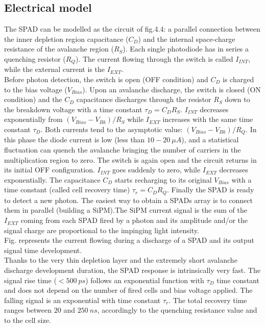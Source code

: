 \subsection*{Electrical model}
The SPAD can be modelled as the circuit of fig.4.4:  a parallel connection between the inner depletion region capacitance ($C_D$) and the internal space-charge resistance of the avalanche region ($R_S$). Each single photodiode has in series a quenching resistor ($R_Q$). The current flowing through the switch is called $I_{INT}$, while the external current is the $I_{EXT}$.\\
Before photon detection, the switch is open (OFF condition) and $C_D$ is charged to the bias voltage ($V_{Bias}$). Upon an avalanche discharge, the switch is closed (ON condition) and the $C_D$ capacitance discharges through the resistor $R_S$ down to the breakdown voltage with a time constant $\tau_D=C_D R_S$. $I_{INT}$ decreases exponentially from $(V_{Bias}-V_{Bk})/R_S$ while $I_{EXT}$ increases with the same time constant $\tau_D$. Both currents tend to the asymptotic value: $(V_{Bias}-V_{Bk})/R_Q$. In this phase the diode current is low (less than $10-20\ \mu A$), and a statistical fluctuation can quench the avalanche bringing the number of carriers in the multiplication region to zero.
The switch is again open and the circuit returns in its initial OFF configuration. $I_{INT}$ goes suddenly to zero, while $I_{EXT}$ decreases exponentially. The capacitance $C_D$ starts recharging to its original $V_{Bias}$ with a time constant (called cell recovery time) $\tau_r=C_D R_Q$. Finally the SPAD is ready to detect a new photon. The easiest way to obtain a SPADs array is to connect them in parallel (building a SiPM).The SiPM current signal is the sum of the $I_{EXT}$ coming from each SPAD fired by a photon and its amplitude and/or the signal charge are proportional to the impinging light intensity.\\
Fig. represents the current flowing during a discharge of a SPAD and its output signal time development.\\
Thanks to the very thin depletion layer and the extremely short avalanche discharge development duration, the SPAD response is intrinsically very fast. The signal rise time ($< 500\ ps$) follows an exponential function with $\tau_D$ time constant and does not depend on the number of fired cells and bias voltage applied. The falling signal is an exponential with time constant $\tau_r$. The total recovery time ranges between $20$ and $250\ ns$, accordingly to the quenching resistance value and to the cell size.\\

